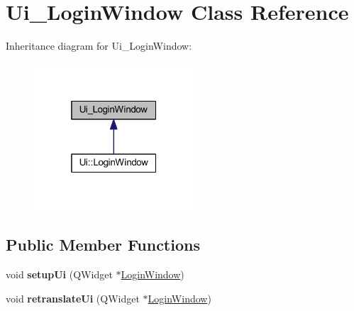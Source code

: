\hypertarget{class_ui___login_window}{}\section{Ui\+\_\+\+Login\+Window Class Reference}
\label{class_ui___login_window}


Inheritance diagram for Ui\+\_\+\+Login\+Window\+:
\nopagebreak
\begin{figure}[H]
\begin{center}
\leavevmode
\includegraphics[width=169pt]{class_ui___login_window__inherit__graph}
\end{center}
\end{figure}
\subsection*{Public Member Functions}
\begin{DoxyCompactItemize}
\item 
\mbox{\label{class_ui___login_window_a1c3ffc6b9784b68654c59db923f3c217}} 
void {\bfseries setup\+Ui} (Q\+Widget $\ast$\mbox{\hyperlink{class_login_window}{Login\+Window}})
\item 
\mbox{\label{class_ui___login_window_a5f6832fbf9554aef841da1efc1b0fa84}} 
void {\bfseries retranslate\+Ui} (Q\+Widget $\ast$\mbox{\hyperlink{class_login_window}{Login\+Window}})
\end{DoxyCompactItemize}

